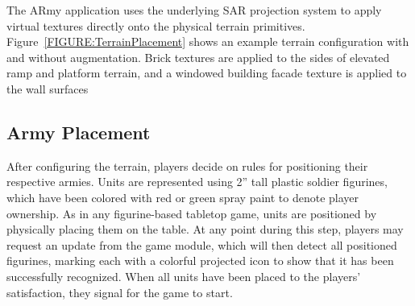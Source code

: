 \documentclass[review]{vgtc}                 %
\begin{document}

The ARmy application uses the underlying SAR projection system to
apply virtual textures directly onto the physical terrain primitives.
Figure~\ref{FIGURE:TerrainPlacement} shows an example terrain
configuration with and without augmentation.  Brick textures are
applied to the sides of elevated ramp and platform terrain, and a
windowed building facade texture is applied to the wall surfaces



\subsection{Army Placement}

After configuring the terrain, players decide on rules for positioning
their respective armies.  Units are represented using 2'' tall plastic
soldier figurines, which have been colored with red or green spray
paint to denote player ownership.  As in any figurine-based tabletop
game, units are positioned by physically placing them on the table.
At any point during this step, players may request an update from the
game module, which will then detect all positioned figurines, marking
each with a colorful projected icon to show that it has been
successfully recognized.
When all units have been placed to the players' satisfaction, they
signal for the game to start.
\end{document}
